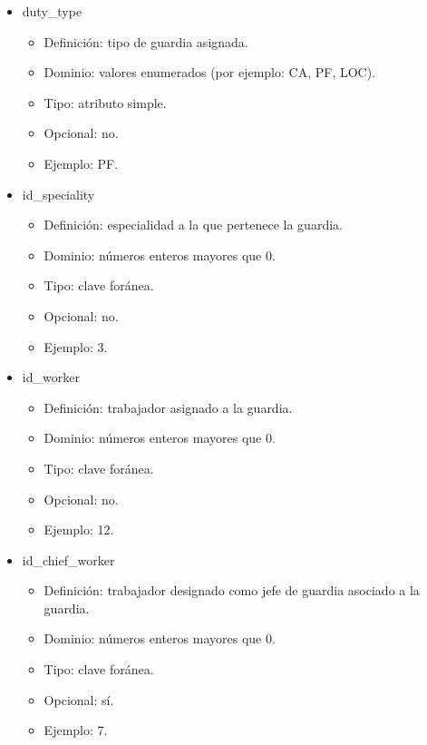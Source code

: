 \begin{itemize}
\begin{itemize}
        \item duty\_type
        \begin{itemize}
            \item Definición: tipo de guardia asignada.
            \item Dominio: valores enumerados (por ejemplo: CA, PF, LOC).
            \item Tipo: atributo simple.
            \item Opcional: no.
            \item Ejemplo: PF.
        \end{itemize}

        \item id\_speciality
        \begin{itemize}
            \item Definición: especialidad a la que pertenece la guardia.
            \item Dominio: números enteros mayores que 0.
            \item Tipo: clave foránea.
            \item Opcional: no.
            \item Ejemplo: 3.
        \end{itemize}

        \item id\_worker
        \begin{itemize}
            \item Definición: trabajador asignado a la guardia.
            \item Dominio: números enteros mayores que 0.
            \item Tipo: clave foránea.
            \item Opcional: no.
            \item Ejemplo: 12.
        \end{itemize}

        \item id\_chief\_worker
        \begin{itemize}
            \item Definición: trabajador designado como jefe de guardia asociado a la guardia.
            \item Dominio: números enteros mayores que 0.
            \item Tipo: clave foránea.
            \item Opcional: sí.
            \item Ejemplo: 7.
        \end{itemize}
    \end{itemize}


\end{itemize}

